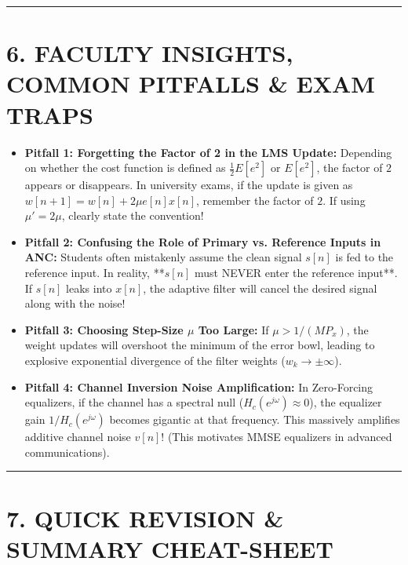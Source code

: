 \documentclass[11pt,a4paper]{article}
\begin{document}
\noindent\rule{\textwidth}{0.5pt}

\section{6. FACULTY INSIGHTS, COMMON PITFALLS \& EXAM TRAPS}

\begin{itemize}
    \item \textbf{Pitfall 1: Forgetting the Factor of 2 in the LMS Update:}
    Depending on whether the cost function is defined as $\frac{1}{2}E[e^2]$ or $E[e^2]$, the factor of $2$ appears or disappears. In university exams, if the update is given as $w[n+1] = w[n] + 2\mu e[n] x[n]$, remember the factor of $2$. If using $\mu' = 2\mu$, clearly state the convention!
    
    \item \textbf{Pitfall 2: Confusing the Role of Primary vs. Reference Inputs in ANC:}
    Students often mistakenly assume the clean signal $s[n]$ is fed to the reference input. In reality, **$s[n]$ must NEVER enter the reference input**. If $s[n]$ leaks into $x[n]$, the adaptive filter will cancel the desired signal along with the noise!
    
    \item \textbf{Pitfall 3: Choosing Step-Size $\mu$ Too Large:}
    If $\mu > 1/(M P_x)$, the weight updates will overshoot the minimum of the error bowl, leading to explosive exponential divergence of the filter weights ($w_k \to \pm\infty$).
    
    \item \textbf{Pitfall 4: Channel Inversion Noise Amplification:}
    In Zero-Forcing equalizers, if the channel has a spectral null ($H_c(e^{j\omega}) \approx 0$), the equalizer gain $1/H_c(e^{j\omega})$ becomes gigantic at that frequency. This massively amplifies additive channel noise $v[n]$! (This motivates MMSE equalizers in advanced communications).
\end{itemize}

\noindent\rule{\textwidth}{0.5pt}

\section{7. QUICK REVISION \& SUMMARY CHEAT-SHEET}
\end{document}
